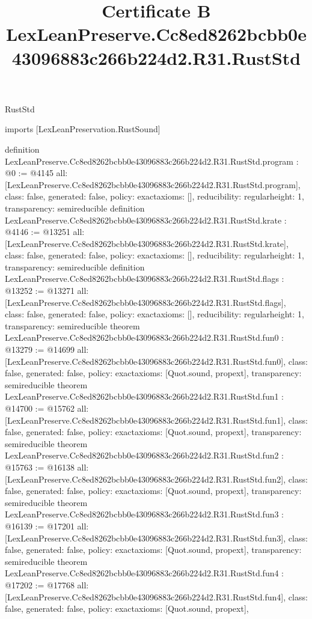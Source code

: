 \begin{lexlean}{RustStd}
\title{Certificate B LexLeanPreserve.Cc8ed8262bcbb0e43096883c266b224d2.R31.RustStd}
\begin{coremodule}
imports [LexLeanPreservation.RustSound]

definition LexLeanPreserve.Cc8ed8262bcbb0e43096883c266b224d2.R31.RustStd.program : @0 := @4145 {
  all: [LexLeanPreserve.Cc8ed8262bcbb0e43096883c266b224d2.R31.RustStd.program],
  class: false,
  generated: false,
  policy: exact{axioms: []},
  reducibility: regular{height: 1},
  transparency: semireducible
}
definition LexLeanPreserve.Cc8ed8262bcbb0e43096883c266b224d2.R31.RustStd.krate : @4146 := @13251 {
  all: [LexLeanPreserve.Cc8ed8262bcbb0e43096883c266b224d2.R31.RustStd.krate],
  class: false,
  generated: false,
  policy: exact{axioms: []},
  reducibility: regular{height: 1},
  transparency: semireducible
}
definition LexLeanPreserve.Cc8ed8262bcbb0e43096883c266b224d2.R31.RustStd.flags : @13252 := @13271 {
  all: [LexLeanPreserve.Cc8ed8262bcbb0e43096883c266b224d2.R31.RustStd.flags],
  class: false,
  generated: false,
  policy: exact{axioms: []},
  reducibility: regular{height: 1},
  transparency: semireducible
}
theorem LexLeanPreserve.Cc8ed8262bcbb0e43096883c266b224d2.R31.RustStd.fun0 : @13279 := @14699 {
  all: [LexLeanPreserve.Cc8ed8262bcbb0e43096883c266b224d2.R31.RustStd.fun0],
  class: false,
  generated: false,
  policy: exact{axioms: [Quot.sound, propext]},
  transparency: semireducible
}
theorem LexLeanPreserve.Cc8ed8262bcbb0e43096883c266b224d2.R31.RustStd.fun1 : @14700 := @15762 {
  all: [LexLeanPreserve.Cc8ed8262bcbb0e43096883c266b224d2.R31.RustStd.fun1],
  class: false,
  generated: false,
  policy: exact{axioms: [Quot.sound, propext]},
  transparency: semireducible
}
theorem LexLeanPreserve.Cc8ed8262bcbb0e43096883c266b224d2.R31.RustStd.fun2 : @15763 := @16138 {
  all: [LexLeanPreserve.Cc8ed8262bcbb0e43096883c266b224d2.R31.RustStd.fun2],
  class: false,
  generated: false,
  policy: exact{axioms: [Quot.sound, propext]},
  transparency: semireducible
}
theorem LexLeanPreserve.Cc8ed8262bcbb0e43096883c266b224d2.R31.RustStd.fun3 : @16139 := @17201 {
  all: [LexLeanPreserve.Cc8ed8262bcbb0e43096883c266b224d2.R31.RustStd.fun3],
  class: false,
  generated: false,
  policy: exact{axioms: [Quot.sound, propext]},
  transparency: semireducible
}
theorem LexLeanPreserve.Cc8ed8262bcbb0e43096883c266b224d2.R31.RustStd.fun4 : @17202 := @17768 {
  all: [LexLeanPreserve.Cc8ed8262bcbb0e43096883c266b224d2.R31.RustStd.fun4],
  class: false,
  generated: false,
  policy: exact{axioms: [Quot.sound, propext]},
}
\end{coremodule}
\end{lexlean}
